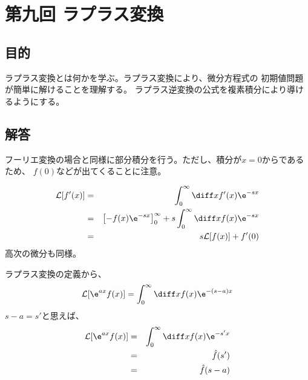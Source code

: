\newpage
\section{第九回 ラプラス変換}

\subsection{目的}

ラプラス変換とは何かを学ぶ。ラプラス変換により、微分方程式の
初期値問題が簡単に解けることを理解する。
ラプラス逆変換の公式を複素積分により導けるようにする。

\subsection{解答}


フーリエ変換の場合と同様に部分積分を行う。ただし、積分が$x=0$からであるため、
$f(0)$などが出てくることに注意。

\begin{eqnarray}
  {\cal L}[f'(x)] &=& \int_0^\infty \diff x f'(x)\e^{-sx} \\
  &=& \left[ -f(x)\e^{-sx} \right]_0^{\infty}  +  s \int_0^\infty \diff x f(x) \e^{-sx}\\
  &=& s {\cal L}[f(x)] + f'(0)
\end{eqnarray}
高次の微分も同様。


ラプラス変換の定義から、
\begin{equation}
  {\cal L}[\e^{ax }f(x)] = \int_0^\infty \diff x f(x)\e^{-(s-a)x}
\end{equation}
$s-a = s'$と思えば、
\begin{eqnarray}
  {\cal L}[\e^{ax }f(x)] &=& \int_0^\infty \diff x f(x)\e^{-s'x}\\
  &=& \hat{f}(s')\\
  &=& \hat{f}(s-a)
\end{eqnarray}

